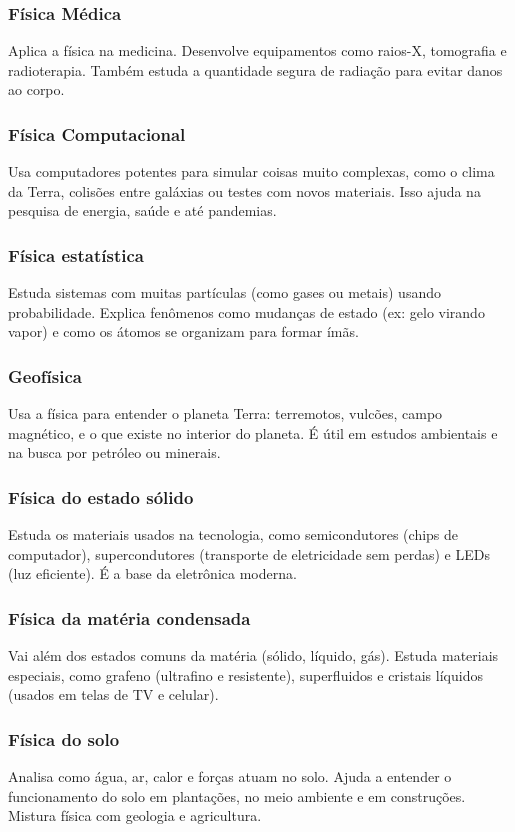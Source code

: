 \documentclass[portuguese,11pt,a4paper,oneside,openany,notitlepage]{article}
\begin{document}
	\subsubsection{Física Médica}
	Aplica a física na medicina. Desenvolve equipamentos como raios-X, tomografia e radioterapia. Também estuda a quantidade segura de radiação para evitar danos ao corpo.
	
	\subsubsection{Física Computacional}
	Usa computadores potentes para simular coisas muito complexas, como o clima da Terra, colisões entre galáxias ou testes com novos materiais. Isso ajuda na pesquisa de energia, saúde e até pandemias.
	
	\subsubsection{Física estatística}
	Estuda sistemas com muitas partículas (como gases ou metais) usando probabilidade. Explica fenômenos como mudanças de estado (ex: gelo virando vapor) e como os átomos se organizam para formar ímãs.
	
	\subsubsection{Geofísica}
	Usa a física para entender o planeta Terra: terremotos, vulcões, campo magnético, e o que existe no interior do planeta. É útil em estudos ambientais e na busca por petróleo ou minerais.
	
	\subsubsection{Física do estado sólido}
	Estuda os materiais usados na tecnologia, como semicondutores (chips de computador), supercondutores (transporte de eletricidade sem perdas) e LEDs (luz eficiente). É a base da eletrônica moderna.
	
	\subsubsection{Física da matéria condensada}
	Vai além dos estados comuns da matéria (sólido, líquido, gás). Estuda materiais especiais, como grafeno (ultrafino e resistente), superfluidos e cristais líquidos (usados em telas de TV e celular).
	
	\subsubsection{Física do solo}
	Analisa como água, ar, calor e forças atuam no solo. Ajuda a entender o funcionamento do solo em plantações, no meio ambiente e em construções. Mistura física com geologia e agricultura.
\end{document}
